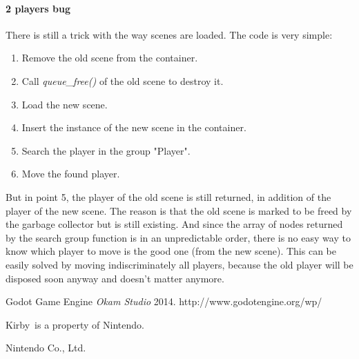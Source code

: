 \documentclass[10pt,a4paper]{article}
\begin{document}
\paragraph{2 players bug}
There is still a trick with the way scenes are loaded. The code is very simple:
\begin{enumerate}
\item Remove the old scene from the container.
\item Call \textit{queue\_free()} of the old scene to destroy it.
\item Load the new scene.
\item Insert the instance of the new scene in the container.
\item Search the player in the group "Player".
\item Move the found player.
\end{enumerate}
But in point 5, the player of the old scene is still returned, in addition of the player of the new scene. The reason is that the old scene is marked to be freed by the garbage collector but is still existing. And since the array of nodes returned by the search group function is in an unpredictable order, there is no easy way to know which player to move is the good one (from the new scene). This can be easily solved by moving indiscriminately all players, because the old player will be disposed soon anyway and doesn't matter anymore.

\begin{thebibliography}{1}

 Godot Game Engine {\em Okam Studio} 2014. 
http://www.godotengine.org/wp/

 Kirby\textcopyright \  is a property of Nintendo\cite{nintendo}.

 Nintendo Co., Ltd.\textcopyright

\end{thebibliography}
\end{document}
